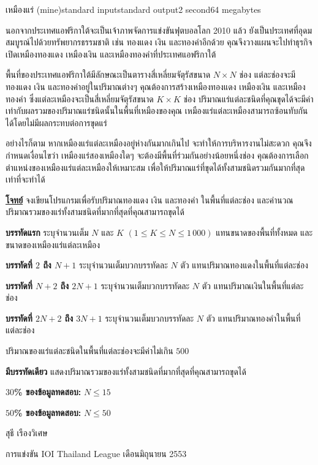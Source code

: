 \documentclass[11pt,a4paper]{article}
\begin{document}
\begin{problem}{เหมืองแร่ (mine)}{standard input}{standard output}{2 second}{64 megabytes}

นอกจากประเทศแอฟริกาใต้จะเป็นเจ้าภาพจัดการแข่งขันฟุตบอลโลก 2010 แล้ว ยังเป็นประเทศที่อุดมสมบูรณ์ไปด้วยทรัพยากรธรรมชาติ เช่น ทองแดง เงิน และทองคำอีกด้วย คุณจึงวางแผนจะไปทำธุรกิจเปิดเหมืองทองแดง เหมืองเงิน และเหมืองทองคำที่ประเทศแอฟริกาใต้

พื้นที่ของประเทศแอฟริกาใต้มีลักษณะเป็นตารางสี่เหลี่ยมจัตุรัสขนาด $N \times N$ ช่อง แต่ละช่องจะมีทองแดง เงิน และทองคำอยู่ในปริมาณต่างๆ คุณต้องการสร้างเหมืองทองแดง เหมืองเงิน และเหมืองทองคำ ซึ่งแต่ละเหมืองจะเป็นสี่เหลี่ยมจัตุรัสขนาด $K \times K$ ช่อง ปริมาณแร่แต่ละชนิดที่คุณขุดได้จะมีค่าเท่ากับผลรวมของปริมาณแร่ชนิดนั้นในพื้นที่เหมืองของคุณ เหมืองแร่แต่ละเหมืองสามารถซ้อนทับกันได้โดยไม่มีผลกระทบต่อการขุดแร่

อย่างไรก็ตาม หากเหมืองแร่แต่ละเหมืองอยู่ห่างกันมากเกินไป จะทำให้การบริหารงานไม่สะดวก คุณจึงกำหนดเงื่อนไขว่า เหมืองแร่สองเหมืองใดๆ จะต้องมีพื้นที่ร่วมกันอย่างน้อยหนึ่งช่อง คุณต้องการเลือกตำแหน่งของเหมืองแร่แต่ละเหมืองให้เหมาะสม เพื่อให้ปริมาณแร่ที่ขุดได้ทั้งสามชนิดรวมกันมากที่สุดเท่าที่จะทำได้

\bigskip
\underline{\textbf{โจทย์}}  จงเขียนโปรแกรมเพื่อรับปริมาณทองแดง เงิน และทองคำ ในพื้นที่แต่ละช่อง และคำนวณปริมาณรวมของแร่ทั้งสามชนิดที่มากที่สุดที่คุณสามารถขุดได้


\InputFile

\textbf{บรรทัดแรก} ระบุจำนวนเต็ม $N$ และ $K$ $(1 \leq K \leq N \leq 1\,000)$ แทนขนาดของพื้นที่ทั้งหมด และขนาดของเหมืองแร่แต่ละเหมือง

\textbf{บรรทัดที่ $2$ ถึง $N+1$} ระบุจำนวนเต็มบวกบรรทัดละ $N$ ตัว แทนปริมาณทองแดงในพื้นที่แต่ละช่อง

\textbf{บรรทัดที่ $N+2$ ถึง $2N+1$} ระบุจำนวนเต็มบวกบรรทัดละ $N$ ตัว แทนปริมาณเงินในพื้นที่แต่ละช่อง

\textbf{บรรทัดที่ $2N+2$ ถึง $3N+1$} ระบุจำนวนเต็มบวกบรรทัดละ $N$ ตัว แทนปริมาณทองคำในพื้นที่แต่ละช่อง

ปริมาณของแร่แต่ละชนิดในพื้นที่แต่ละช่องจะมีค่าไม่เกิน $500$


\OutputFile

\textbf{มีบรรทัดเดียว} แสดงปริมาณรวมของแร่ทั้งสามชนิดที่มากที่สุดที่คุณสามารถขุดได้


\Examples

\begin{example}
%
%
\end{example}

\Scoring 

\textbf{$30$\% ของข้อมูลทดสอบ:} $N \leq 15$

\textbf{$50$\% ของข้อมูลทดสอบ:} $N \leq 50$

\Source

สุธี เรืองวิเศษ

การแข่งขัน IOI Thailand League เดือนมิถุนายน 2553

\end{problem}
\end{document}
